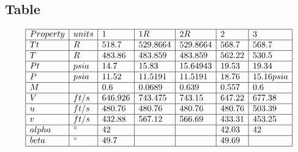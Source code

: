 \documentclass[preview,12pt]{article}
\begin{document}
\begin{center}
    \section*{Table}
\end{center}
$$
\begin{array}{ | l | l | l | l | l | l | l | }
\hline
	Property & units & 1 & 1R & 2R & 2 & 3 \\ \hline
	Tt & R & 518.7 & 529.8664 & 529.8664 & 568.7 & 568.7 \\ \hline
	T & R & 483.86 & 483.859 & 483.859 & 562.22 & 530.5 \\ \hline
	Pt & psia & 14.7 & 15.83 & 15.64943 & 19.53 & 19.34 \\ \hline
	P & psia & 11.52 & 11.5191 & 11.5191 & 18.76 & 15.16psia \\ \hline
	M &  & 0.6 & 0.0689 & 0.639 & 0.557 & 0.6 \\ \hline
	V & ft/s & 646.926 & 743.475 & 743.15 & 647.22 & 677.38 \\ \hline
	u & ft/s & 480.76 & 480.76 & 480.76 & 480.76 & 503.39 \\ \hline
	v & ft/s & 432.88 & 567.12 & 566.69 & 433.31 & 453.25 \\ \hline
	alpha & \degree & 42 &  &  & 42.03 & 42 \\ \hline
	beta & \degree & 49.7 &  &  & 49.69 &  \\ \hline
\end{array}
$$
\end{document}
